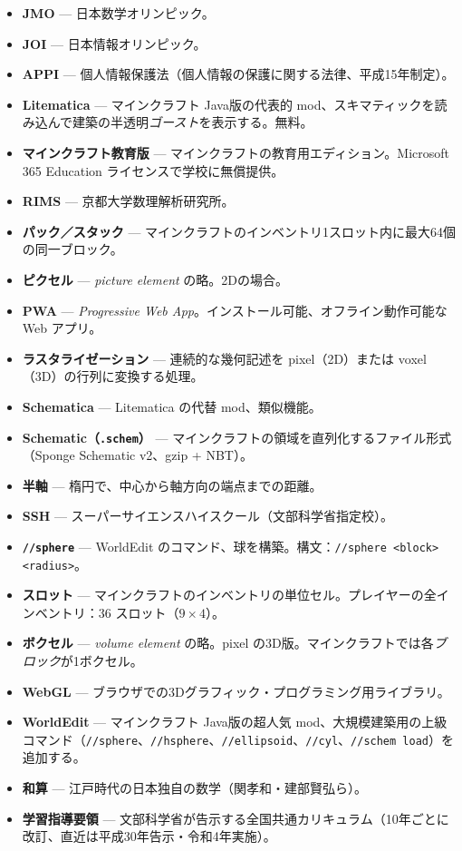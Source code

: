 \documentclass[12pt,a4paper]{scrartcl}
\newcommand{\code}[1]{\texttt{\small #1}}
\newcommand{\acc}[1]{\textcolor{accent}{\textbf{#1}}}
\newcommand{\cmd}[1]{\textcolor{earth}{\texttt{\small #1}}}
\begin{document}
\begin{itemize}[leftmargin=1.4em,itemsep=0.3em,topsep=0.3em]
  \item \acc{JMO} --- 日本数学オリンピック。
  \item \acc{JOI} --- 日本情報オリンピック。
  \item \acc{APPI} --- 個人情報保護法（個人情報の保護に関する法律、平成15年制定）。
  \item \acc{Litematica} --- マインクラフト Java版の代表的 mod、スキマティックを読み込んで建築の半透明\emph{ゴースト}を表示する。無料。
  \item \acc{マインクラフト教育版} --- マインクラフトの教育用エディション。Microsoft 365 Education ライセンスで学校に無償提供。
  \item \acc{RIMS} --- 京都大学数理解析研究所。
  \item \acc{パック／スタック} --- マインクラフトのインベントリ1スロット内に最大64個の同一ブロック。
  \item \acc{ピクセル} --- \emph{picture element} の略。2Dの場合。
  \item \acc{PWA} --- \emph{Progressive Web App}。インストール可能、オフライン動作可能な Web アプリ。
  \item \acc{ラスタライゼーション} --- 連続的な幾何記述を pixel（2D）または voxel（3D）の行列に変換する処理。
  \item \acc{Schematica} --- Litematica の代替 mod、類似機能。
  \item \acc{Schematic（\texttt{.schem}）} --- マインクラフトの領域を直列化するファイル形式（Sponge Schematic v2、gzip + NBT）。
  \item \acc{半軸} --- 楕円で、中心から軸方向の端点までの距離。
  \item \acc{SSH} --- スーパーサイエンスハイスクール（文部科学省指定校）。
  \item \acc{\code{//sphere}} --- WorldEdit のコマンド、球を構築。構文：\cmd{//sphere <block> <radius>}。
  \item \acc{スロット} --- マインクラフトのインベントリの単位セル。プレイヤーの全インベントリ：36 スロット（$9 \times 4$）。
  \item \acc{ボクセル} --- \emph{volume element} の略。pixel の3D版。マインクラフトでは各\emph{ブロック}が1ボクセル。
  \item \acc{WebGL} --- ブラウザでの3Dグラフィック・プログラミング用ライブラリ。
  \item \acc{WorldEdit} --- マインクラフト Java版の超人気 mod、大規模建築用の上級コマンド（\cmd{//sphere}、\cmd{//hsphere}、\cmd{//ellipsoid}、\cmd{//cyl}、\cmd{//schem load}）を追加する。
  \item \acc{和算} --- 江戸時代の日本独自の数学（関孝和・建部賢弘ら）。
  \item \acc{学習指導要領} --- 文部科学省が告示する全国共通カリキュラム（10年ごとに改訂、直近は平成30年告示・令和4年実施）。
\end{itemize}
\end{document}
